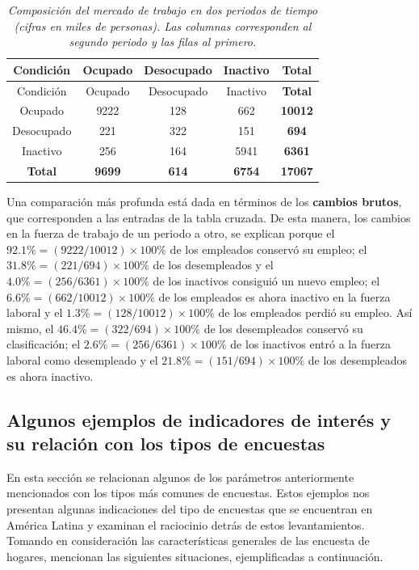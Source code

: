 \documentclass[
  12pt,
  spanish,
]{book}
\begin{document}
\begin{longtable}[]{@{}ccccc@{}}
\caption{\emph{Composición del mercado de trabajo en dos periodos de tiempo (cifras en miles de personas). Las columnas corresponden al segundo periodo y las filas al primero.}}\tabularnewline
\toprule
Condición & Ocupado & Desocupado & Inactivo & \textbf{Total} \\
\midrule
\endfirsthead
\toprule
Condición & Ocupado & Desocupado & Inactivo & \textbf{Total} \\
\midrule
\endhead
Ocupado & 9222 & 128 & 662 & \textbf{10012} \\
Desocupado & 221 & 322 & 151 & \textbf{694} \\
Inactivo & 256 & 164 & 5941 & \textbf{6361} \\
\textbf{Total} & \textbf{9699} & \textbf{614} & \textbf{6754} & \textbf{17067} \\
\bottomrule
\end{longtable}

Una comparación más profunda está dada en términos de los \textbf{cambios brutos}, que corresponden a las entradas de la tabla cruzada. De esta manera, los cambios en la fuerza de trabajo de un periodo a otro, se explican porque el \(92.1 \%=(9222/10012) \times 100 \%\) de los empleados conservó su empleo; el \(31.8\% = (221 / 694 )\times 100 \%\) de los desempleados y el \(4.0 \% = (256/6361)\times 100 \%\) de los inactivos consiguió un nuevo empleo; el \(6.6\% = (662/10012)\times 100 \%\) de los empleados es ahora inactivo en la fuerza laboral y el \(1.3\% = (128/10012)\times 100 \%\) de los empleados perdió su empleo. Así mismo, el \(46.4\% = (322/694)\times 100 \%\) de los desempleados conservó su clasificación; el \(2.6\% = (256 / 6361)\times 100 \%\) de los inactivos entró a la fuerza laboral como desempleado y el \(21.8\% = (151 / 694)\times 100 \%\) de los desempleados es ahora inactivo.

\hypertarget{algunos-ejemplos-de-indicadores-de-interuxe9s-y-su-relaciuxf3n-con-los-tipos-de-encuestas}{%
\subsection*{Algunos ejemplos de indicadores de interés y su relación con los tipos de encuestas}\label{algunos-ejemplos-de-indicadores-de-interuxe9s-y-su-relaciuxf3n-con-los-tipos-de-encuestas}}

En esta sección se relacionan algunos de los parámetros anteriormente mencionados con los tipos más comunes de encuestas. Estos ejemplos nos presentan algunas indicaciones del tipo de encuestas que se encuentran en América Latina y examinan el raciocinio detrás de estos levantamientos. Tomando en consideración las características generales de las encuesta de hogares, \citet{Duncan_Kalton_1987} mencionan las siguientes situaciones, ejemplificadas a continuación.
\end{document}
